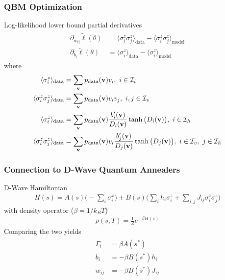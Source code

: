 \documentclass{beamer}
\begin{document}
\begin{frame}
    \frametitle{QBM Optimization}
    Log-likelihood lower bound partial derivatives
    \begin{align}
    \begin{split}
        \partial_{w_{ij}} \tilde{\ell}(\theta)
            &= \langle \sigma_i^z \sigma_j^z \rangle_\text{data} - \langle \sigma_i^z \sigma_j^z \rangle_\text{model} \\
        \partial_{b_i} \tilde{\ell}(\theta)
            &= \langle \sigma_i^z \rangle_\text{data} - \langle \sigma_i^z \rangle_\text{model}
    \end{split}
    \end{align}
    where
    \begin{align}
    \begin{split}
        \langle \sigma_i^z \rangle_\text{data}
            &= \sum_{\mathbf{v}} p_{\text{data}}(\mathbf{v}) v_i,
            \ i \in \mathcal{I}_v \\
        \langle \sigma_i^z \sigma_j^z \rangle_\text{data}
            &= \sum_{\mathbf{v}} p_{\text{data}}(\mathbf{v}) v_i v_j,
            \ i, j \in \mathcal{I}_v \\
        \langle \sigma_i^z \rangle_\text{data}
            &= \sum_{\mathbf{v}} p_{\text{data}}(\mathbf{v}) \frac{b_i'(\mathbf{v})}{D_i(\mathbf{v})} \tanh\big(D_i(\mathbf{v})\big),
            \ i \in \mathcal{I}_h \\
        \langle \sigma_i^z \sigma_j^z \rangle_\text{data}
            &= \sum_{\mathbf{v}} p_{\text{data}}(\mathbf{v}) v_i \frac{b_j'(\mathbf{v})}{D_j(\mathbf{v})} \tanh\big(D_j(\mathbf{v})\big),
            \ i \in \mathcal{I}_v, \ j \in \mathcal{I}_h
    \end{split}
    \end{align}
\end{frame}

\begin{frame}
    \frametitle{Connection to D-Wave Quantum Annealers}
    D-Wave Hamiltonian~\cite{dwave_qa}
    \begin{align}
        H(s) = A(s) \bigg( -\sum_i \sigma_i^x \bigg) + B(s) \bigg( \sum_i h_i \sigma_i^z + \sum_{i,j} J_{ij} \sigma_i^z \sigma_j^z \bigg)
    \end{align}
    with density operator (\( \beta = 1 / k_B T \))
    \begin{align}
        \rho(s, T) = \frac{1}{Z} e^{-\beta H(s)}
    \end{align}
    Comparing the two yields
    \begin{align}
    \begin{split}
        \Gamma_i
            &= \beta A(s^*) \\
        b_i
            &= -\beta B(s^*) h_i \\
        w_{ij}
            &= -\beta B(s^*) J_{ij}
        \label{eq:qbm_scaling}
    \end{split}
    \end{align}
\end{frame}
\end{document}

